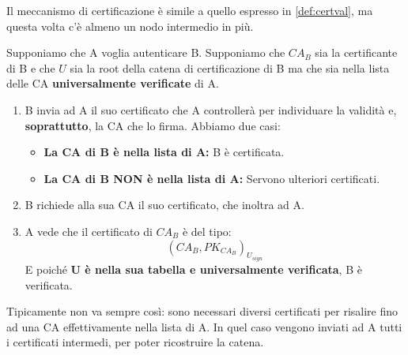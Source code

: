 Il meccanismo di certificazione è simile a quello espresso in \cref{def:certval}, ma questa volta c'è almeno un nodo intermedio in più.
\begin{definition}\label{def:certchain}
Supponiamo che A voglia autenticare B. Supponiamo che \textbf{$CA_B$} sia la certificante di B e che $U$ sia la root della catena di certificazione di B ma che sia nella lista delle CA \textbf{universalmente verificate} di A.
\begin{enumerate}
    \item B invia ad A il suo certificato che A controllerà per individuare la validità e, \textbf{soprattutto}, la CA che lo firma. Abbiamo due casi: 
\begin{itemize}
    \item \textbf{La CA di B è nella lista di A:} B è certificata.
    \item \textbf{La CA di B NON è nella lista di A:} Servono ulteriori certificati.  
\end{itemize}
\item B richiede alla sua CA il suo certificato, che inoltra ad A.
\item A vede che il certificato di $CA_B$ è del tipo: \[(CA_B, PK_{CA_B})_{U_{sign}}\]
E poiché \textbf{U è nella sua tabella e universalmente verificata}, B è verificata.
\end{enumerate}
\end{definition}
\begin{remark}
Tipicamente non va sempre così: sono necessari diversi certificati per risalire fino ad una CA effettivamente nella lista di A. In quel caso vengono inviati ad A tutti i certificati intermedi, per poter ricostruire la catena. 
\end{remark}
